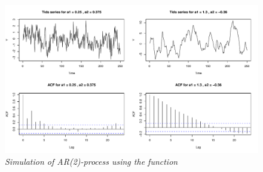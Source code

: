 \begin{figure}
    \centering
    \includegraphics[width=140mm]{ar2-sim-1.pdf}
    \caption{\textit{Simulation of AR(2)-process using the  function}}
    \label{fig:ar2-sim-1}
\end{figure}

